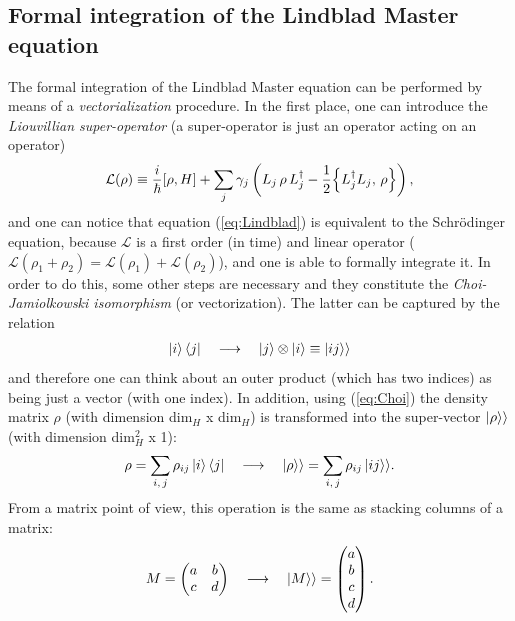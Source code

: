 \subsection{Formal integration of the Lindblad Master equation}

The formal integration of the Lindblad Master equation can be performed by means of a \textit{vectorialization} procedure. In the first place, one can introduce the \textit{Liouvillian super-operator} (a super-operator is just an operator acting on an operator)
\begin{equation}
    \mathcal{L}(\rho) \equiv \frac{i}{\hbar} [\rho,H] + \sum_j \gamma_j \left( L_j \, \rho \,  L_j^\dagger - \frac{1}{2} \Bigl\{ L_j^\dagger L_j, \, \rho \Bigr\} \right),
    \label{eq:Liouvillian}
\end{equation}
and one can notice that equation (\ref{eq:Lindblad}) is equivalent to the Schr\"odinger equation, because $\mathcal{L}$ is a first order (in time) and linear operator ($\mathcal{L}(\rho_1 + \rho_2) = \mathcal{L}(\rho_1) + \mathcal{L}(\rho_2)$), and one is able to formally integrate it. In order to do this, some other steps are necessary and they constitute the \textit{Choi-Jamiolkowski isomorphism} (or vectorization). The latter can be captured by the relation
\begin{align}
    \ket{i}\bra{j} \quad \longrightarrow \quad \ket{j} \otimes \ket{i} \equiv \ket{ij}\rangle
    \label{eq:Choi}
\end{align}
and therefore one can think about an outer product (which has two indices) as being just a vector (with one index). In addition, using (\ref{eq:Choi}) the density matrix $\rho$ (with dimension dim$_H$ x dim$_H$) is transformed into the super-vector $\ket{\rho}\rangle$ (with dimension dim$^2_H$ x 1): 
\begin{align*}
        \rho = \sum_{i, \, j} \rho_{ij} \ket{i}\bra{j} \quad \longrightarrow \quad \ket{\rho}\rangle = \sum_{i, \, j} \rho_{ij} \ket{ij}\rangle.
\end{align*}
From a matrix point of view, this operation is the same as stacking columns of a matrix:
\begin{align}
    M = \begin{pmatrix} a & b \\ c & d \end{pmatrix}  \quad \longrightarrow \quad \ket{M}\rangle = \begin{pmatrix} a \\ b \\ c \\ d \end{pmatrix}.
    \label{eq:matrixtransf}
\end{align}
